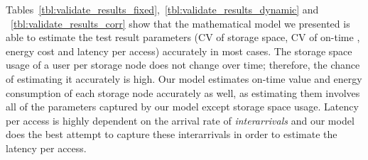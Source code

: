 \documentclass[preprint,12pt]{elsarticle}
\begin{document}
Tables~\ref{tbl:validate_results_fixed},~\ref{tbl:validate_results_dynamic} and ~\ref{tbl:validate_results_corr} show
that the mathematical model we presented is able to estimate the test result parameters (CV of storage space, CV of on-time
, energy cost and latency per access) accurately in most
cases. The storage space usage of a user per storage node does not change over time; therefore, the chance of
estimating it accurately is high. Our model estimates on-time value and energy consumption of each storage node accurately
as well, as estimating them involves all of the parameters captured by our model except storage space usage.
Latency per access is highly dependent on the arrival rate of \textit{interarrivals} and our model does the best attempt to
capture these interarrivals in order to estimate the latency per access.
\end{document}
